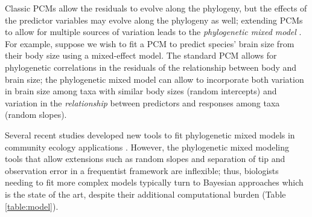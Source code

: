 \documentclass[12pt]{article}
\begin{document}
Classic PCMs allow the residuals to evolve along the phylogeny, but the effects of the predictor variables may evolve along the phylogeny as well; extending PCMs to allow for multiple sources of variation leads to the  \emph{phylogenetic mixed model} \citep{housworth2004phylogenetic}.
For example, suppose we wish to fit a PCM to predict species' brain size from their body size \cite{felsenstein1985phylogenies} using a mixed-effect model.
The standard PCM allows for phylogenetic correlations in the residuals of the relationship between body and brain size; the phylogenetic mixed model can allow to incorporate both
variation in brain size among taxa with similar body sizes (random intercepts) and
variation in the \emph{relationship} between predictors and responses among taxa (random slopes).

Several recent studies developed new tools to fit phylogenetic mixed models in
community ecology applications \citep{nowakowski2018phylogenetic, li2017canfun}.
However, the phylogenetic mixed modeling tools that allow extensions such as random slopes
and separation of tip and observation error in a frequentist framework are inflexible; thus, biologists needing to fit more complex models typically turn to Bayesian approaches which is the state of the art, despite their additional computational burden \citep{hadfield2010mcmc, burkner2018brms, kostikova2016bridging} (Table \ref{table:model}).
\end{document}
